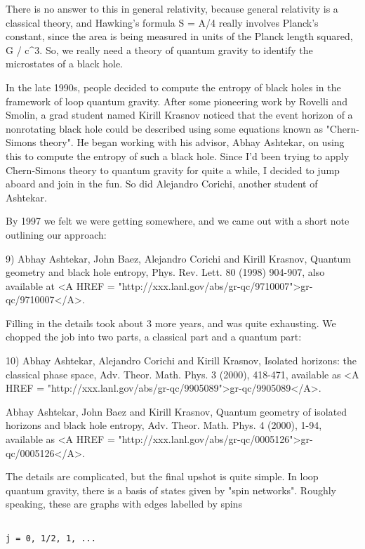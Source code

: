 There is no answer to this in general relativity, because general
relativity is a classical theory, and Hawking's formula S = A/4 really
involves Planck's constant, since the area is being measured in units of
the Planck length squared, \hbar  G / c^{3}.  
So, we really need a theory of
quantum gravity to identify the microstates of a black hole.

In the late 1990s, people decided to compute the entropy of black holes
in the framework of loop quantum gravity.  After some pioneering work
by Rovelli and Smolin, a grad student named Kirill Krasnov noticed that
the event horizon of a nonrotating black hole could be described using
some equations known as "Chern-Simons theory".  He began working with
his advisor, Abhay Ashtekar, on using this to compute the entropy of
such a black hole.  Since I'd been trying to apply Chern-Simons theory
to quantum gravity for quite a while, I decided to jump aboard and join
in the fun.  So did Alejandro Corichi, another student of Ashtekar.

By 1997 we felt we were getting somewhere, and we came out with a short
note outlining our approach:

9) Abhay Ashtekar, John Baez, Alejandro Corichi and Kirill Krasnov,
Quantum geometry and black hole entropy, Phys. Rev. Lett. 80 (1998) 
904-907, also available at <A HREF = "http://xxx.lanl.gov/abs/gr-qc/9710007">gr-qc/9710007</A>.  

Filling in the details took about 3 more years, and was quite
exhausting.  We chopped the job into two parts, a classical part 
and a quantum part:

10) Abhay Ashtekar, Alejandro Corichi and Kirill Krasnov, Isolated
horizons: the classical phase space, Adv. Theor.  Math. Phys. 3 (2000),
418-471, available as <A HREF = "http://xxx.lanl.gov/abs/gr-qc/9905089">gr-qc/9905089</A>.

Abhay Ashtekar, John Baez and Kirill Krasnov, Quantum geometry of
isolated horizons and black hole entropy, Adv. Theor. Math. Phys. 4
(2000), 1-94, available as <A HREF = "http://xxx.lanl.gov/abs/gr-qc/0005126">gr-qc/0005126</A>.

The details are complicated, but the final upshot is quite simple.  
In loop quantum gravity, there is a basis of states given by "spin
networks".  Roughly speaking, these are graphs with edges labelled by
spins


\begin{verbatim}

j = 0, 1/2, 1, ...
\end{verbatim}
    

